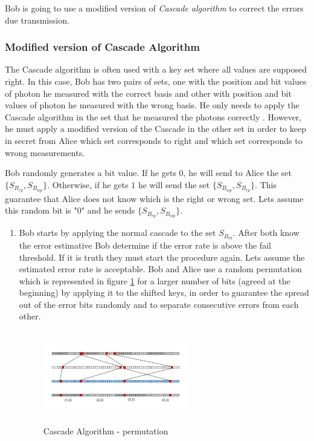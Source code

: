 \begin{enumerate}
      Bob is going to use a modified version of \textit{Cascade algorithm} to correct the errors due transmission.

      \subsubsection{Modified version of Cascade Algorithm}
      The Cascade algorithm is often used with a key set where all values are supposed right. In this case, Bob has two pairs of sets, one with the position and bit values of photon he measured with the correct basis and other with position and bit values of photon he measured with the wrong basis. He only needs to apply the Cascade algorithm in the set that he measured the photons correctly \cite{Brassard1994}. However, he must apply a modified version of the Cascade in the other set in order to keep in secret from Alice which set corresponds to right and which set corresponds to wrong measurements.

      Bob randomly generates a bit value. If he gets $0$, he will send to Alice the set $\{ S_{B_{rp}}, S_{B_{wp}}\}$. Otherwise, if he gets $1$ he will send the set $\{S_{B_{wp}}, S_{B_{rp}}\}$. This guarantee that Alice does not know which is the right or wrong set. Lets assume this random bit is "0" and he sends $\{S_{B_{rp}}, S_{B_{wp}}\}$.

      \begin{enumerate}
        \item Bob starts by applying the normal cascade to the set $S_{B_{rb}}$. After both know the error estimative Bob determine if the error rate is above the fail threshold. If it is truth they must start the procedure again. Lets assume the estimated error rate is acceptable. Bob and Alice use a random permutation which is represented in figure \ref{cascadepermutation} for a larger number of bits (agreed at the beginning) by applying it to the shifted keys, in order to guarantee the spread out of the error bits randomly and to separate consecutive errors from each other.

            \begin{figure}[h]
            	\centering
            	\includegraphics[width=0.6\textwidth, height=4cm]{./sdf/qokd_with_discrete_variables/figures/cascade_permutation.png}
                	\caption{Cascade Algorithm - permutation}\label{cascadepermutation}
            \end{figure}


\end{enumerate}
\end{enumerate}
